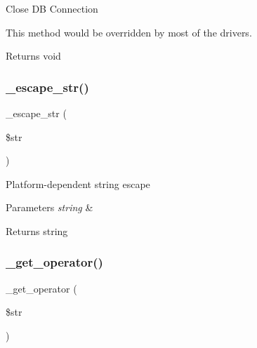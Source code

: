 Close DB Connection

This method would be overridden by most of the drivers.

\begin{DoxyReturn}{Returns}
void 
\end{DoxyReturn}
\mbox{\label{class_c_i___d_b__driver_af8ef0237bfcdb19215b63fff769e7a55}} 
\subsubsection{\texorpdfstring{\+\_\+escape\+\_\+str()}{\_escape\_str()}}
{\footnotesize\ttfamily \+\_\+escape\+\_\+str (\begin{DoxyParamCaption}\item[{}]{\$str }\end{DoxyParamCaption})\hspace{0.3cm}{\ttfamily [protected]}}

Platform-\/dependent string escape


\begin{DoxyParams}{Parameters}
{\em string} & \\
\hline
\end{DoxyParams}
\begin{DoxyReturn}{Returns}
string 
\end{DoxyReturn}
\mbox{\label{class_c_i___d_b__driver_af932ab30583179e70fa44f91dc9c5b4d}} 
\subsubsection{\texorpdfstring{\+\_\+get\+\_\+operator()}{\_get\_operator()}}
{\footnotesize\ttfamily \+\_\+get\+\_\+operator (\begin{DoxyParamCaption}\item[{}]{\$str }\end{DoxyParamCaption})\hspace{0.3cm}{\ttfamily [protected]}}

